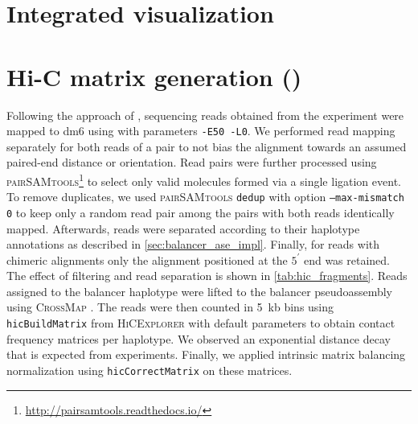 \section{Integrated visualization}



\FloatBarrier



\section{Hi-C matrix generation (\texorpdfstring{\alek}{Aleksander Jankowski})}
\label{sec:suppl_hic}

Following the approach of \citet{Ramirez2018}, sequencing reads obtained from
the \hic experiment were mapped to \ac{dm6} using \bwamem with parameters
\texttt{-E50 -L0}. We performed read mapping separately for both reads of a pair
to not bias the alignment towards an assumed paired-end distance or orientation.
Read pairs were further processed using \textsc{pairSAMtools}\footnote{\url{http://pairsamtools.readthedocs.io/}}
to select only valid \hic molecules formed via a single ligation event. To
remove \pcr duplicates, we used \textsc{pairSAMtools} \texttt{dedup} with option
\texttt{--max-mismatch 0} to keep only a random read pair among the pairs with
both reads identically mapped. Afterwards, reads were separated according to
their haplotype annotations as described in \cref{sec:balancer_ase_impl}.
Finally, for reads with chimeric alignments only the alignment positioned at the
$5^\prime$ end was retained. The effect of filtering and read separation is
shown in \cref{tab:hic_fragments}. Reads assigned to the balancer haplotype were
lifted to the balancer pseudoassembly using \textsc{CrossMap} \citep{Zhao2014}.
The reads were then counted in 5~kb bins using \texttt{hicBuildMatrix} from
\textsc{HiCExplorer} with default parameters \citep{Ramirez2018} to obtain
contact frequency matrices per haplotype. We observed an exponential distance
decay that is expected from \hic experiments. Finally, we applied intrinsic
matrix balancing normalization using \texttt{hicCorrectMatrix} on these matrices.


